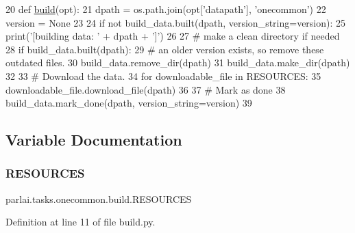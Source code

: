 \begin{DoxyCode}
20 \textcolor{keyword}{def }\hyperlink{namespacedialog__babi__feedback_1_1build_a7a9d289f7493a5ded13c4b7f071b6184}{build}(opt):
21     dpath = os.path.join(opt[\textcolor{stringliteral}{'datapath'}], \textcolor{stringliteral}{'onecommon'})
22     version = \textcolor{keywordtype}{None}
23 
24     \textcolor{keywordflow}{if} \textcolor{keywordflow}{not} build\_data.built(dpath, version\_string=version):
25         print(\textcolor{stringliteral}{'[building data: '} + dpath + \textcolor{stringliteral}{']'})
26 
27         \textcolor{comment}{# make a clean directory if needed}
28         \textcolor{keywordflow}{if} build\_data.built(dpath):
29             \textcolor{comment}{# an older version exists, so remove these outdated files.}
30             build\_data.remove\_dir(dpath)
31         build\_data.make\_dir(dpath)
32 
33         \textcolor{comment}{# Download the data.}
34         \textcolor{keywordflow}{for} downloadable\_file \textcolor{keywordflow}{in} RESOURCES:
35             downloadable\_file.download\_file(dpath)
36 
37         \textcolor{comment}{# Mark as done}
38         build\_data.mark\_done(dpath, version\_string=version)
39 \end{DoxyCode}


\subsection{Variable Documentation}
\mbox{\label{namespaceparlai_1_1tasks_1_1onecommon_1_1build_ac96c78cd9c65edd3fcdb7ac7c6ac5872}} 
\subsubsection{\texorpdfstring{R\+E\+S\+O\+U\+R\+C\+ES}{RESOURCES}}
{\footnotesize\ttfamily parlai.\+tasks.\+onecommon.\+build.\+R\+E\+S\+O\+U\+R\+C\+ES}



Definition at line 11 of file build.\+py.

